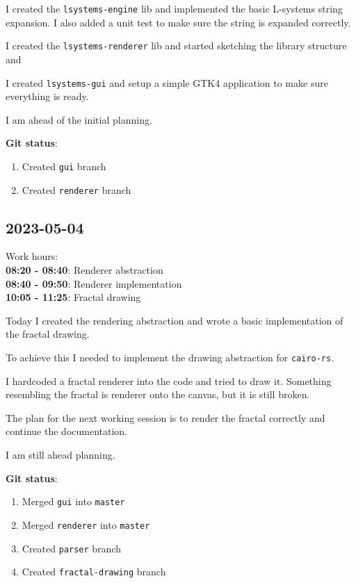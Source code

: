 \documentclass{article}
\begin{document}
I created the \texttt{lsystems-engine} lib and
implemented the basic L-systems string expansion.
I also added a unit test to make sure the string is expanded correctly.

I created the \texttt{lsystems-renderer} lib and
started sketching the library structure and

I created \texttt{lsystems-gui} and
setup a simple GTK4 application to make sure everything is ready.

I am ahead of the initial planning.

\textbf{Git status}:
\begin{enumerate}
    \item Created \texttt{gui} branch
    \item Created \texttt{renderer} branch
\end{enumerate}

\subsection{2023-05-04}

Work hours:\\
\textbf{08:20 - 08:40}: Renderer abstraction \\
\textbf{08:40 - 09:50}: Renderer implementation \\
\textbf{10:05 - 11:25}: Fractal drawing

Today I created the rendering abstraction
and wrote a basic implementation of the fractal drawing.

To achieve this I needed to implement the drawing abstraction for \texttt{cairo-rs}.

I hardcoded a fractal renderer into the code and tried to draw it.
Something resembling the fractal is renderer onto the canvas,
but it is still broken.

The plan for the next working session is to render the fractal correctly
and continue the documentation.

I am still ahead planning.

\textbf{Git status}:
\begin{enumerate}
    \item Merged \texttt{gui} into \texttt{master}
    \item Merged \texttt{renderer} into \texttt{master}
    \item Created \texttt{parser} branch
    \item Created \texttt{fractal-drawing} branch
\end{enumerate}
\end{document}
